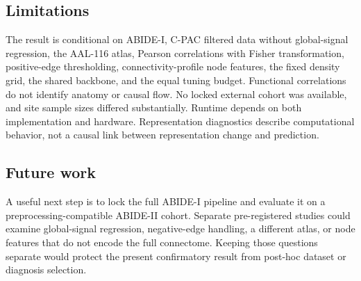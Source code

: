 \subsection{Limitations}

The result is conditional on ABIDE-I, C-PAC filtered data without global-signal
regression, the AAL-116 atlas, Pearson correlations with Fisher
transformation, positive-edge thresholding, connectivity-profile node
features, the fixed density grid, the shared backbone, and the equal tuning
budget. Functional correlations do not identify anatomy or causal flow. No
locked external cohort was available, and site sample sizes differed
substantially. Runtime depends on both implementation and hardware.
Representation diagnostics describe computational behavior, not a causal link
between representation change and prediction.

\subsection{Future work}

A useful next step is to lock the full ABIDE-I pipeline and evaluate it on a
preprocessing-compatible ABIDE-II cohort. Separate pre-registered studies
could examine global-signal regression, negative-edge handling, a different
atlas, or node features that do not encode the full connectome. Keeping those
questions separate would protect the present confirmatory result from
post-hoc dataset or diagnosis selection.
